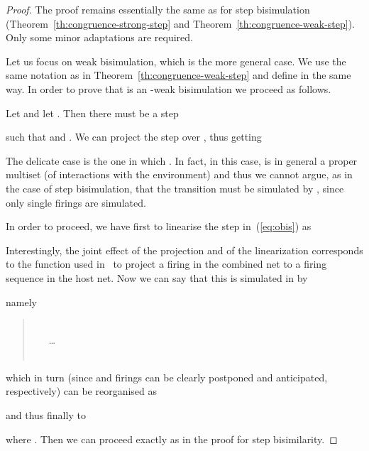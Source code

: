 \documentclass{LMCS}
\begin{document}
\begin{proof}
  The proof remains essentially the same as for step bisimulation
  (Theorem~\ref{th:congruence-strong-step} and
  Theorem~\ref{th:congruence-weak-step}). Only some minor adaptations
  are required.

  Let us focus on weak bisimulation, which is the more general case.
  We use the same notation as in Theorem~\ref{th:congruence-weak-step}
  and define  in the same way. In order to prove that
   is an -weak bisimulation we proceed as
  follows.


Let  and let . Then there must be a step
\begin{center}
  
\end{center}
such that  and
.
We can project the step over , thus getting

The delicate case is the one in which . In fact, in this case,  is in general a proper
multiset (of interactions with the environment) and thus we cannot
argue, as in the case of step bisimulation, that the transition  must be simulated by , since
only single firings are simulated.

In order to proceed, we have first to linearise the step in~(\ref{eq:obis}) as

Interestingly, the joint effect of the projection and of the
linearization corresponds to the function  used
in~\cite[page~96]{v:modular-petri} to project a firing in the combined
net to a firing sequence in the host net.
Now we can say that this is simulated in  by 
\begin{center}
  
\end{center}
namely
\begin{quote}
  \\
  \mbox{} \ \ \   \ldots\\
  \mbox{} \ \ \ 
\end{quote}
which in turn (since  and  firings can be clearly
postponed and anticipated, respectively) can be reorganised as
\begin{center}
  
\end{center}
and thus finally to
\begin{center}
  
\end{center}
where . Then we can proceed exactly as in the proof for step bisimilarity.
\end{proof}
\end{document}
